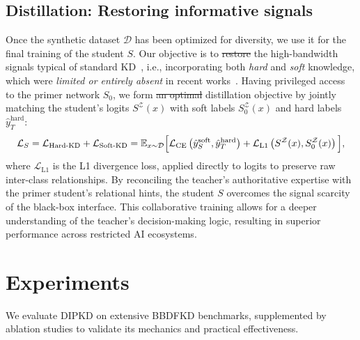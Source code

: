 \documentclass[12pt, a4paper, twoside]{book}
\makeatletter
\numberwithin{equation}{chapter}
\theoremstyle{plain}
\theoremstyle{definition}
\theoremstyle{remark}
\newenvironment{foldable}{}{}
\newcommand*{\ie}{i.e.}
\providecommand{\DIFaddtex}[1]{{\protect\color{blue}\uwave{#1}}} %
\providecommand{\DIFdeltex}[1]{{\protect\color{red}\sout{#1}}} %
\providecommand{\DIFaddbegin}{} %
\providecommand{\DIFaddend}{} %
\providecommand{\DIFdelbegin}{} %
\providecommand{\DIFdelend}{} %
\providecommand{\DIFadd}[1]{\texorpdfstring{\DIFaddtex{#1}}{#1}} %
\providecommand{\DIFdel}[1]{\texorpdfstring{\DIFdeltex{#1}}{}} %
\newcommand{\DIFscaledelfig}{0.5}
\newlength{\DIFdelgraphicswidth} %
\newlength{\DIFdelgraphicsheight} %
\newcommand{\DIFaddincludegraphics}[2][]{{\color{blue}\fbox{\DIFOincludegraphics[#1]{#2}}}} %
\newcommand{\DIFdelincludegraphics}[2][]{%
\sbox{\DIFdelgraphicsbox}{\DIFOincludegraphics[#1]{#2}}%
\settoboxwidth{\DIFdelgraphicswidth}{\DIFdelgraphicsbox} %
\settoboxtotalheight{\DIFdelgraphicsheight}{\DIFdelgraphicsbox} %
\scalebox{\DIFscaledelfig}{%
\parbox[b]{\DIFdelgraphicswidth}{\usebox{\DIFdelgraphicsbox}\\[-\baselineskip] \rule{\DIFdelgraphicswidth}{0em}}\llap{\resizebox{\DIFdelgraphicswidth}{\DIFdelgraphicsheight}{%
\setlength{\unitlength}{\DIFdelgraphicswidth}%
\begin{picture}(1,1)%
\thicklines\linethickness{2pt} %
{\color[rgb]{1,0,0}\put(0,0){\framebox(1,1){}}}%
{\color[rgb]{1,0,0}\put(0,0){\line( 1,1){1}}}%
{\color[rgb]{1,0,0}\put(0,1){\line(1,-1){1}}}%
\end{picture}%
}\hspace*{3pt}}} %
} %
\DeclareRobustCommand{\DIFaddbegin}{\DIFOaddbegin \let\includegraphics\DIFaddincludegraphics} %
\DeclareRobustCommand{\DIFaddend}{\DIFOaddend \let\includegraphics\DIFOincludegraphics} %
\DeclareRobustCommand{\DIFdelbegin}{\DIFOdelbegin \let\includegraphics\DIFdelincludegraphics} %
\DeclareRobustCommand{\DIFdelend}{\DIFOaddend \let\includegraphics\DIFOincludegraphics} %
\let\sout@orig\sout %
\renewcommand{\sout}[1]{\ifmmode\text{\sout@orig{\ensuremath{#1}}}\else\sout@orig{#1}\fi} %
\makeatother
\begin{document}
\subsection{Distillation: Restoring informative signals} \label{sec:43-research02-framework-distillation}
\begin{foldable}
  Once the synthetic dataset $\mathcal{D}$ has been optimized for diversity, we use it for the final training of the student $S$.
  Our objective is to \DIFdelbegin \DIFdel{restore }\DIFdelend \DIFaddbegin \DIFadd{approximate }\DIFaddend the high-bandwidth signals typical of standard \ac{KD}~\cite{hinton2015distilling}, \ie, incorporating both \textit{hard} and \textit{soft} knowledge, which were \textit{limited or entirely absent} in recent works~\cite{wang2021zero, zhang2022ideal, yuan2024data}.
  Having privileged access to the primer network $S_0$, we form \DIFdelbegin \DIFdel{an optimal }\DIFdelend \DIFaddbegin \DIFadd{a }\DIFaddend distillation objective by jointly matching the student's logits $S^\mathcal{Z}(x)$ with soft labels $S_{0}^\mathcal{Z}(x)$ and hard labels $\hat{y}_{T}^\text{hard}$:
  \begin{equation} \label{eq:loss-kd-total}
    \mathcal{L}_{S}
    = \mathcal{L}_\text{Hard-KD} + \mathcal{L}_\text{Soft-KD} \\
    = \mathbb{E}_{x \sim \mathcal{D}}\Big[
      \mathcal{L}_\text{CE}\left( \hat{y}_{S}^\text{soft}, \hat{y}_{T}^\text{hard} \right) +
      \mathcal{L}_\text{L1}\left( S^\mathcal{Z}(x), S_{0}^\mathcal{Z}(x) \right)
    \Big],
  \end{equation}
  where $\mathcal{L}_\text{L1}$ is the L1 divergence loss, applied directly to logits to preserve raw inter-class relationships.
  By reconciling the teacher's authoritative expertise with the primer student's relational hints, the student $S$ overcomes the signal scarcity of the black-box interface.
  This collaborative training allows for a deeper understanding of the teacher's decision-making logic, resulting in superior performance across restricted \ac{AI} ecosystems.
\end{foldable}
 \section{Experiments} \label{sec:44-research02-experiments}
\begin{foldable} We evaluate \ac{DIPKD} on extensive BBDFKD benchmarks, supplemented by ablation studies to validate its mechanics and practical effectiveness.
\end{foldable}
\end{document}

